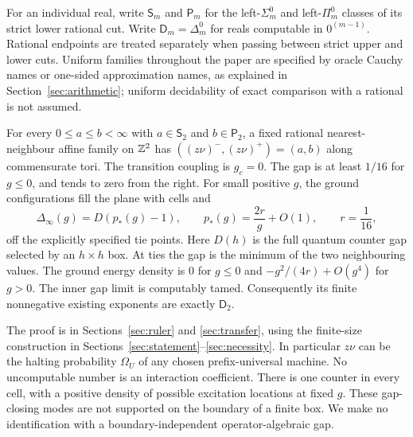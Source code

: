 For an individual real, write $\mathsf S_m$ and $\mathsf P_m$ for the
left-$\Sigma^0_m$ and left-$\Pi^0_m$ classes of its strict lower rational
cut. Write $\mathsf D_m=\Delta^0_m$ for reals computable in
$0^{(m-1)}$. Rational endpoints are treated separately when passing
between strict upper and lower cuts. Uniform families throughout the
paper are specified by oracle Cauchy names or one-sided approximation
names, as explained in Section~\ref{sec:arithmetic}; uniform decidability
of exact comparison with a rational is not assumed.

\begin{theorem}\label{thm:bulk-headline}
For every $0\leq a\leq b<\infty$ with $a\in\mathsf S_2$ and
$b\in\mathsf P_2$, a fixed rational nearest-neighbour affine family on
$\mathbb Z^2$ has $((z\nu)^-,(z\nu)^+)=(a,b)$ along commensurate tori.
The transition coupling is $g_c=0$. The gap is at least $1/16$ for
$g\leq0$, and tends to zero from the right. For small positive $g$,
the ground configurations fill the plane with cells and
\[
 \Delta_\infty(g)=D(p_*(g)-1),\qquad p_*(g)=\frac{2r}{g}+O(1),
 \qquad r=\frac1{16},
\]
off the explicitly specified tie points. Here $D(h)$ is the full quantum
counter gap selected by an $h\times h$ box. At ties the gap is the
minimum of the two neighbouring values. The ground energy density is
$0$ for $g\leq0$ and $-g^2/(4r)+O(g^4)$ for $g>0$.
The inner gap limit is computably tamed. Consequently its finite
nonnegative existing exponents are exactly $\mathsf D_2$.
\end{theorem}

The proof is in Sections~\ref{sec:ruler} and \ref{sec:transfer}, using
the finite-size construction in Sections~\ref{sec:statement}--\ref{sec:necessity}.
In particular $z\nu$ can be the halting probability $\Omega_U$ of any
chosen prefix-universal machine. No uncomputable number is an interaction
coefficient. There is one counter in every cell, with a positive density
of possible excitation locations at fixed $g$. These gap-closing modes
are not supported on the boundary of a finite box. We make no
identification with a boundary-independent operator-algebraic gap.


